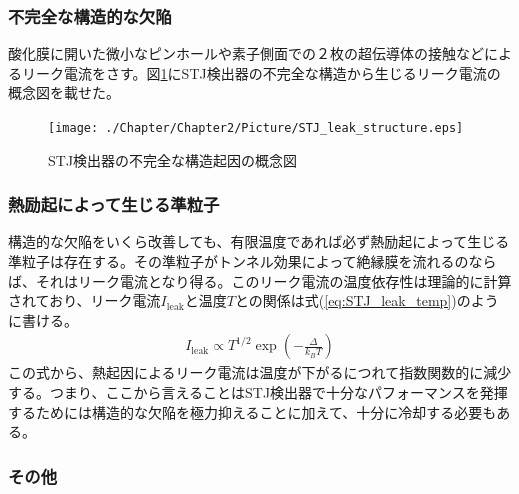		\subsubsection{不完全な構造的な欠陥}
			酸化膜に開いた微小なピンホールや素子側面での２枚の超伝導体の接触などによるリーク電流をさす。図\ref{fig:STJ_leak_structure}にSTJ検出器の不完全な構造から生じるリーク電流の概念図を載せた。
			\begin{figure}[htbp]
  				\begin{center}
    					\texttt{[image: ./Chapter/Chapter2/Picture/STJ\_leak\_structure.eps]}
    					\caption{STJ検出器の不完全な構造起因の概念図}
    					\label{fig:STJ_leak_structure}
  				\end{center}
			\end{figure}	
		
		\subsubsection{熱励起によって生じる準粒子}
		構造的な欠陥をいくら改善しても、有限温度であれば必ず熱励起によって生じる準粒子は存在する。その準粒子がトンネル効果によって絶縁膜を流れるのならば、それはリーク電流となり得る。このリーク電流の温度依存性は理論的に計算されており、リーク電流$I_{\mathrm{leak}}$と温度$T$との関係は式(\ref{eq:STJ_leak_temp})のように書ける。\cite{13}
		\begin{eqnarray}
			I_{\mathrm{leak}} \propto T^{1/2} \exp \left(- \frac{\Delta}{k_{B}T} \right)
			\label{eq:STJ_leak_temp}
		\end{eqnarray}
		この式から、熱起因によるリーク電流は温度が下がるにつれて指数関数的に減少する。つまり、ここから言えることはSTJ検出器で十分なパフォーマンスを発揮するためには構造的な欠陥を極力抑えることに加えて、十分に冷却する必要もある。
		
		\subsubsection{その他}	
	
